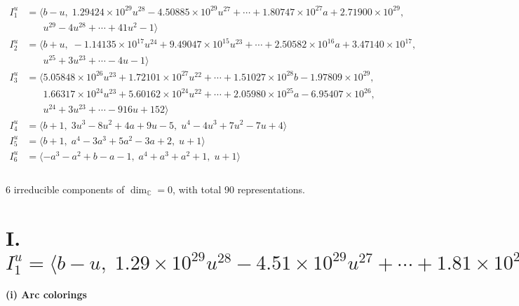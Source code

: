 \documentclass[1p]{elsarticle_modified}
\theoremstyle{definition}
\begin{document}
\begin{align*}
I^u_{1}&=\langle 
b- u,\;1.29424\times10^{29} u^{28}-4.50885\times10^{29} u^{27}+\cdots+1.80747\times10^{27} a+2.71900\times10^{29},\\
\phantom{I^u_{1}}&\phantom{= \langle  }u^{29}-4 u^{28}+\cdots+41 u^2-1\rangle \\
I^u_{2}&=\langle 
b+u,\;-1.14135\times10^{17} u^{24}+9.49047\times10^{15} u^{23}+\cdots+2.50582\times10^{16} a+3.47140\times10^{17},\\
\phantom{I^u_{2}}&\phantom{= \langle  }u^{25}+3 u^{23}+\cdots-4 u-1\rangle \\
I^u_{3}&=\langle 
5.05848\times10^{26} u^{23}+1.72101\times10^{27} u^{22}+\cdots+1.51027\times10^{28} b-1.97809\times10^{29},\\
\phantom{I^u_{3}}&\phantom{= \langle  }1.66317\times10^{24} u^{23}+5.60162\times10^{24} u^{22}+\cdots+2.05980\times10^{25} a-6.95407\times10^{26},\\
\phantom{I^u_{3}}&\phantom{= \langle  }u^{24}+3 u^{23}+\cdots-916 u+152\rangle \\
I^u_{4}&=\langle 
b+1,\;3 u^3-8 u^2+4 a+9 u-5,\;u^4-4 u^3+7 u^2-7 u+4\rangle \\
I^u_{5}&=\langle 
b+1,\;a^4-3 a^3+5 a^2-3 a+2,\;u+1\rangle \\
I^u_{6}&=\langle 
- a^3- a^2+b- a-1,\;a^4+a^3+a^2+1,\;u+1\rangle \\
\\
\end{align*}
\raggedright * 6 irreducible components of $\dim_{\mathbb{C}}=0$, with total 90 representations.\\
\newpage
\renewcommand{\arraystretch}{1}
\centering \section*{I. $I^u_{1}= \langle b- u,\;1.29\times10^{29} u^{28}-4.51\times10^{29} u^{27}+\cdots+1.81\times10^{27} a+2.72\times10^{29},\;u^{29}-4 u^{28}+\cdots+41 u^2-1 \rangle$}
\flushleft \textbf{(i) Arc colorings}\\
\end{document}

